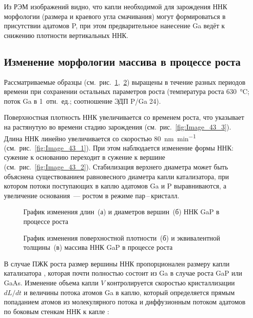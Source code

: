 Из РЭМ изображений видно, что капли необходимой для зарождения ННК морфологии
(размера и краевого угла смачивания) могут формироваться в присутствии адатомов
P, при этом предварительное нанесение Ga ведёт к снижению плотности
вертикальных ННК.

\subsection{Изменение морфологии массива в процессе
роста}\label{subsec:ch6/sec2/sub2}

Рассматриваемые образцы
(см.~рис.~\cref{fig:Image_43_12},~\cref{fig:Image_43_34}) выращены в течение
разных периодов времени при сохранении остальных параметров роста (температура
роста 630~\si{\degreeCelsius}; поток Ga в 1~отн.~ед.; соотношение ЭДП P/Ga 24).

Поверхностная плотность ННК увеличивается со временем роста, что указывает на растянутую во времени стадию
зарождения (см.~рис.~\cref{fig:Image_43_3}).
Длина ННК линейно увеличивается со скоростью
80~\si{\nano\meter\per\minute} (см.~рис.~\cref{fig:Image_43_1}). При этом
наблюдается изменение формы ННК: сужение к основанию переходит в сужение к
вершине (см.~рис.~\cref{fig:Image_43_2}). Стабилизация верхнего диаметра может
быть объяснена существованием равновесного диаметра капли катализатора, при
котором потоки поступающих в каплю адатомов Ga и P выравниваются, а увеличение
основания~--- ростом в режиме пар\,--\,кристалл.

\begin{figure}[ht]  \caption{}График
	изменения длин~(а) и диаметров вершин~(б) ННК GaP в процессе
роста\label{fig:Image_43_12} \end{figure}

\begin{figure}[ht]  \caption{График
	изменения поверхностной плотности~(б) и эквивалентной толщины~(в) массива ННК
	GaP в процессе роста}\label{fig:Image_43_34} \end{figure}

В случае ПЖК роста размер вершины ННК пропорционален размеру капли катализатора \cite{glas2010vapor}, которая почти полностью состоит из Ga в случае роста GaP или GaAs. Изменение объема капли \(V\) контролируется скоростью кристаллизации \(dL/dt\) и величины потока атомов Ga в каплю, который определяется прямым попаданием атомов из молекулярного потока и диффузионным потоком адатомов по боковым стенкам ННК к капле \cite{glas2010vapor}:

